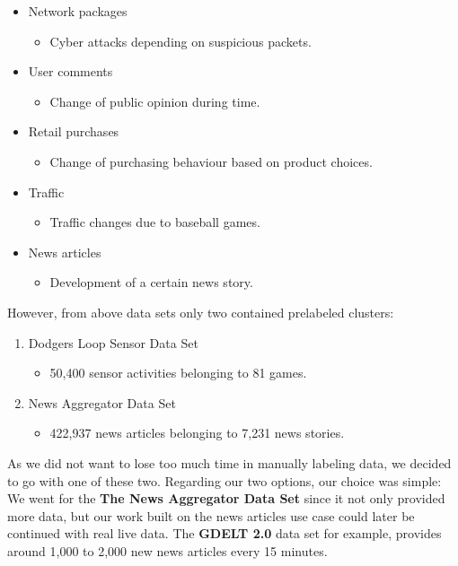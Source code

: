 \begin{itemize}
    \item Network packages
        \begin{itemize}
            \item Cyber attacks depending on suspicious packets.
        \end{itemize}
    \item User comments
        \begin{itemize}
            \item Change of public opinion during time.
        \end{itemize}
    \item Retail purchases
        \begin{itemize}
            \item Change of purchasing behaviour based on product choices.
        \end{itemize}
    \item Traffic
        \begin{itemize}
            \item Traffic changes due to baseball games.
        \end{itemize}
    \item News articles
        \begin{itemize}
            \item Development of a certain news story.
        \end{itemize}
\end{itemize}

However, from above data sets only two contained prelabeled clusters:

\begin{enumerate}
    \item Dodgers Loop Sensor Data Set
        \begin{itemize}
            \item 50,400 sensor activities belonging to 81 games.
        \end{itemize}
    \item News Aggregator Data Set
        \begin{itemize}
            \item 422,937 news articles belonging to 7,231 news stories.
        \end{itemize}
\end{enumerate}

As we did not want to lose too much time in manually labeling data, we decided to go with one of these two.
Regarding our two options, our choice was simple:\\
We went for the \textbf{The News Aggregator Data Set} since it not only provided more data,
but our work built on the news articles use case could later be continued with real live data.
The \textbf{GDELT 2.0} data set for example, provides around 1,000 to 2,000 new news articles every 15 minutes.

